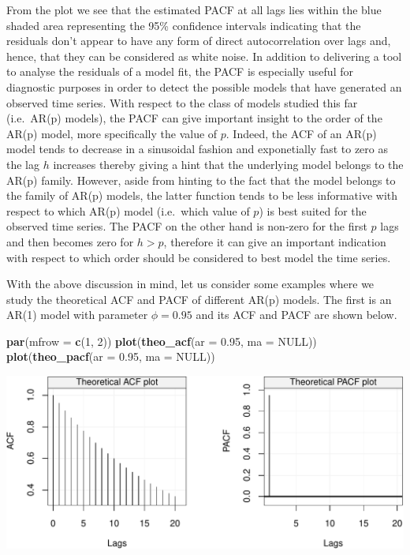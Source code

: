\documentclass[]{book}
\newenvironment{Shaded}{\begin{snugshade}}{\end{snugshade}}
\newcommand{\DataTypeTok}[1]{\textcolor[rgb]{0.13,0.29,0.53}{#1}}
\newcommand{\DecValTok}[1]{\textcolor[rgb]{0.00,0.00,0.81}{#1}}
\newcommand{\FloatTok}[1]{\textcolor[rgb]{0.00,0.00,0.81}{#1}}
\newcommand{\KeywordTok}[1]{\textcolor[rgb]{0.13,0.29,0.53}{\textbf{#1}}}
\newcommand{\NormalTok}[1]{#1}
\newcommand{\OtherTok}[1]{\textcolor[rgb]{0.56,0.35,0.01}{#1}}
\theoremstyle{definition}
\theoremstyle{definition}
\theoremstyle{definition}
\theoremstyle{remark}
\begin{document}
From the plot we see that the estimated PACF at all lags lies within the
blue shaded area representing the 95\% confidence intervals indicating
that the residuals don't appear to have any form of direct
autocorrelation over lags and, hence, that they can be considered as
white noise. In addition to delivering a tool to analyse the residuals
of a model fit, the PACF is especially useful for diagnostic purposes in
order to detect the possible models that have generated an observed time
series. With respect to the class of models studied this far (i.e.~AR(p)
models), the PACF can give important insight to the order of the AR(p)
model, more specifically the value of \(p\). Indeed, the ACF of an AR(p)
model tends to decrease in a sinusoidal fashion and exponetially fast to
zero as the lag \(h\) increases thereby giving a hint that the
underlying model belongs to the AR(p) family. However, aside from
hinting to the fact that the model belongs to the family of AR(p)
models, the latter function tends to be less informative with respect to
which AR(p) model (i.e.~which value of \(p\)) is best suited for the
observed time series. The PACF on the other hand is non-zero for the
first \(p\) lags and then becomes zero for \(h > p\), therefore it can
give an important indication with respect to which order should be
considered to best model the time series.

With the above discussion in mind, let us consider some examples where
we study the theoretical ACF and PACF of different AR(p) models. The
first is an AR(1) model with parameter \(\phi = 0.95\) and its ACF and
PACF are shown below.

\begin{Shaded}
\begin{Highlighting}[]
\KeywordTok{par}\NormalTok{(}\DataTypeTok{mfrow =} \KeywordTok{c}\NormalTok{(}\DecValTok{1}\NormalTok{, }\DecValTok{2}\NormalTok{))}
\KeywordTok{plot}\NormalTok{(}\KeywordTok{theo_acf}\NormalTok{(}\DataTypeTok{ar =} \FloatTok{0.95}\NormalTok{, }\DataTypeTok{ma =} \OtherTok{NULL}\NormalTok{))}
\KeywordTok{plot}\NormalTok{(}\KeywordTok{theo_pacf}\NormalTok{(}\DataTypeTok{ar =} \FloatTok{0.95}\NormalTok{, }\DataTypeTok{ma =} \OtherTok{NULL}\NormalTok{))}
\end{Highlighting}
\end{Shaded}

\includegraphics{ts_files/figure-latex/unnamed-chunk-42-1.pdf}
\end{document}
